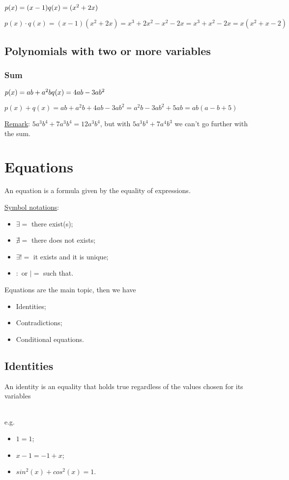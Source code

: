 \documentclass{article}
\newcommand{\figbox}[1]{ 
    \begin{figure*}[ht!]        
        \begin{center}            
            \fbox{#1}        
        \end{center}    
    \end{figure*}
}
\begin{document}
$p(x)=(x-1)\\
q(x)=(x^2+2x)$

$p(x)\cdot q(x)=(x-1)(x^2+2x)=x^3+2x^2-x^2-2x=x^3+x^2-2x=x(x^2+x-2)$

\subsection{Polynomials with two or more variables}
\subsubsection{Sum}
$p(x)=ab+a^2b\\
q(x)=4ab-3ab^2$

$p(x)+q(x)=ab+a^2b+4ab-3ab^2=a^2b-3ab^2+5ab=ab(a-b+5)$

\underline{Remark}: $5a^3b^4+7a^3b^4=12a^3b^4$, but with $5a^3b^4+7a^4b^3$ we can't go further with the sum.

\section{Equations}
An equation is a formula given by the equality of expressions.

\underline{Symbol notations}: 
\begin{itemize}
    \item $\exists =$ there exist(s);
    \item $\nexists =$ there does not exists;
    \item $\exists! =$ it exists and it is unique;
    \item $:$ or $| =$ such that.
\end{itemize}

Equations are the main topic, then we have
\begin{itemize}
    \item Identities;
    \item Contradictions;
    \item Conditional equations.
\end{itemize}

\newpage
\subsection{Identities}
An identity is an equality that holds true regardless of the values chosen for its variables
\figbox{$\forall x \in \mathbb{R},\ \exists y \in \mathbb{R}\ |\ f(x,y)=0$}\\
e.g.
\begin{itemize}
    \item $1=1$;
    \item $x-1=-1+x$;
    \item $sin^2(x)+cos^2(x)=1$.
\end{itemize}
\end{document}
